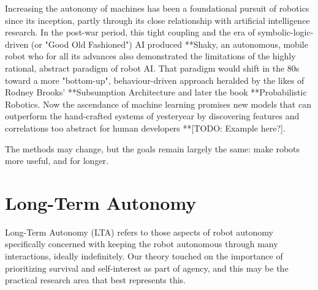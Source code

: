 \documentclass{sfuthesis}
\begin{document}
Increasing the autonomy of machines has been a foundational pursuit of robotics since its inception, partly through its close relationship with artificial intelligence research. In the post-war period, this tight coupling and the era of symbolic-logic-driven (or "Good Old Fashioned") AI produced **Shaky, an autonomous, mobile robot who for all its advances also demonstrated the limitations of the highly rational, abstract paradigm of robot AI. That paradigm would shift in the 80s toward a more "bottom-up", behaviour-driven approach heralded by the likes of Rodney Brooks' **Subsumption Architecture and later the book **Probabilistic Robotics. Now the ascendance of machine learning promises new models that can outperform the hand-crafted systems of yesteryear by discovering features and correlations too abstract for human developers **[TODO: Example here?].

The methods may change, but the goals remain largely the same: make robots more useful, and for longer.
















\section{Long-Term Autonomy}

Long-Term Autonomy (LTA) refers to those aspects of robot autonomy specifically concerned with keeping the robot autonomous through many interactions, ideally indefinitely. Our theory touched on the importance of prioritizing survival and self-interest as part of agency, and this may be the practical research area that best represents this.
\end{document}
